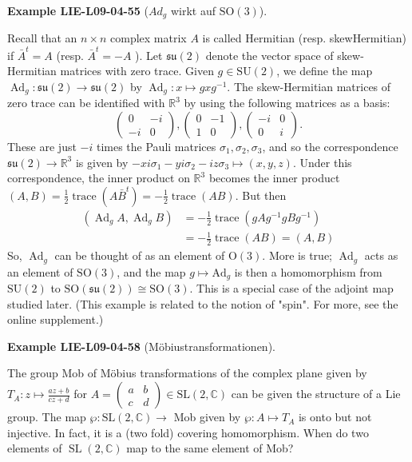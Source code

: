 \documentclass[10pt, letterpaper]{article}
\newcommand{\SO}{\mathrm{SO}}
\newcommand{\CustomHeading}[3]{%
  \par\medskip\noindent%
  \textbf{#1 #2} \textnormal{(#3)}.\enskip%
}
\newenvironment{EXA}[2]{\CustomHeading{Example}{#1}{#2}}{}
\begin{document}
\begin{EXA}{LIE-L09-04-55}{$Ad_g$ wirkt auf $\SO(3)$}
Recall that an $n \times n$ complex matrix $A$ is called Hermitian (resp. skewHermitian) if $\bar{A}^{t}=A$ (resp. $\bar{A}^{t}=-A$ ). Let $\mathfrak{s u}(2)$ denote the vector space of skew-Hermitian matrices with zero trace. Given $g \in \mathrm{SU}(2)$, we define the map $\operatorname{Ad}_{g}: \mathfrak{s u}(2) \rightarrow \mathfrak{s u}(2)$ by $\operatorname{Ad}_{g}: x \mapsto g x g^{-1}$. The skew-Hermitian matrices of zero trace can be identified with $\mathbb{R}^{3}$ by using the following matrices as a basis:
$$
\left(\begin{array}{cc}
0 & -i \\
-i & 0
\end{array}\right),\left(\begin{array}{cc}
0 & -1 \\
1 & 0
\end{array}\right),\left(\begin{array}{cc}
-i & 0 \\
0 & i
\end{array}\right) .
$$
These are just $-i$ times the Pauli matrices $\sigma_{1}, \sigma_{2}, \sigma_{3}$, and so the correspondence $\mathfrak{s u}(2) \rightarrow \mathbb{R}^{3}$ is given by $-x i \sigma_{1}-y i \sigma_{2}-i z \sigma_{3} \mapsto(x, y, z)$. Under this correspondence, the inner product on $\mathbb{R}^{3}$ becomes the inner product $(A, B)=\frac{1}{2} \operatorname{trace}\left(A \bar{B}^{t}\right)=-\frac{1}{2} \operatorname{trace}(A B)$. But then
$$
\begin{aligned}
\left(\operatorname{Ad}_{g} A, \operatorname{Ad}_{g} B\right) & =-\frac{1}{2} \operatorname{trace}\left(g A g^{-1} g B g^{-1}\right) \\
& =-\frac{1}{2} \operatorname{trace}(A B)=(A, B)
\end{aligned}
$$
So, $\operatorname{Ad}_{g}$ can be thought of as an element of $\mathrm{O}(3)$. More is true; $\operatorname{Ad}_{g}$ acts as an element of $\mathrm{SO}(3)$, and the map $g \mapsto \mathrm{Ad}_{g}$ is then a homomorphism from $\mathrm{SU}(2)$ to $\mathrm{SO}(\mathfrak{s u}(2)) \cong \mathrm{SO}(3)$. This is a special case of the adjoint map studied later. (This example is related to the notion of "spin". For more, see the online supplement.)
\end{EXA}

\begin{EXA}{LIE-L09-04-58}{Möbiustransformationen}
The group Mob of Möbius transformations of the complex plane given by $T_{A}: z \mapsto \frac{a z+b}{c z+d}$ for $A=\left(\begin{array}{ll}a & b \\ c & d\end{array}\right) \in \mathrm{SL}(2, \mathbb{C})$ can be given the structure of a Lie group. The map $\wp: \mathrm{SL}(2, \mathbb{C}) \rightarrow$ Mob given by $\wp: A \mapsto T_{A}$ is onto but not injective. In fact, it is a (two fold) covering homomorphism. When do two elements of $\operatorname{SL}(2, \mathbb{C})$ map to the same element of Mob?
\end{EXA}
\end{document}
